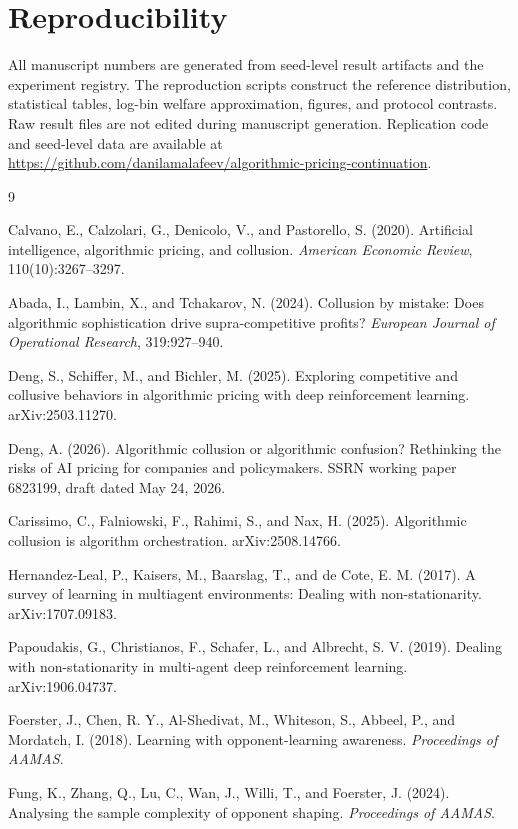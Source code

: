 \documentclass[11pt]{article}
\begin{document}
\section{Reproducibility}

All manuscript numbers are generated from seed-level result artifacts and the
experiment registry. The reproduction scripts construct the reference
distribution, statistical tables, log-bin welfare approximation, figures, and
protocol contrasts. Raw result files are not edited during manuscript
generation. Replication code and seed-level data are available at
\url{https://github.com/danilamalafeev/algorithmic-pricing-continuation}.

\footnotesize
\begin{thebibliography}{9}

Calvano, E., Calzolari, G., Denicolo, V., and Pastorello, S. (2020).
Artificial intelligence, algorithmic pricing, and collusion.
\emph{American Economic Review}, 110(10):3267--3297.

Abada, I., Lambin, X., and Tchakarov, N. (2024).
Collusion by mistake: Does algorithmic sophistication drive
supra-competitive profits?
\emph{European Journal of Operational Research}, 319:927--940.

Deng, S., Schiffer, M., and Bichler, M. (2025).
Exploring competitive and collusive behaviors in algorithmic pricing with
deep reinforcement learning.
arXiv:2503.11270.

Deng, A. (2026).
Algorithmic collusion or algorithmic confusion? Rethinking the risks of AI
pricing for companies and policymakers.
SSRN working paper 6823199, draft dated May 24, 2026.

Carissimo, C., Falniowski, F., Rahimi, S., and Nax, H. (2025).
Algorithmic collusion is algorithm orchestration.
arXiv:2508.14766.

Hernandez-Leal, P., Kaisers, M., Baarslag, T., and de Cote, E. M. (2017).
A survey of learning in multiagent environments: Dealing with
non-stationarity.
arXiv:1707.09183.

Papoudakis, G., Christianos, F., Schafer, L., and Albrecht, S. V. (2019).
Dealing with non-stationarity in multi-agent deep reinforcement learning.
arXiv:1906.04737.

Foerster, J., Chen, R. Y., Al-Shedivat, M., Whiteson, S., Abbeel, P., and
Mordatch, I. (2018).
Learning with opponent-learning awareness.
\emph{Proceedings of AAMAS}.

Fung, K., Zhang, Q., Lu, C., Wan, J., Willi, T., and Foerster, J. (2024).
Analysing the sample complexity of opponent shaping.
\emph{Proceedings of AAMAS}.

\end{thebibliography}
\normalsize
\end{document}
